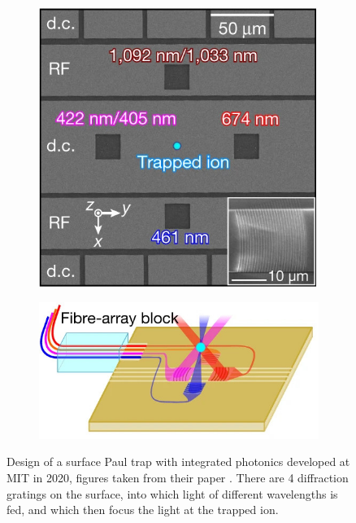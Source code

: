 \begin{figure}[H]
    \centering
    \begin{subfigure}[b]{0.3\textwidth}
        \centering
        \includegraphics[width=\textwidth]{images/TIQC_MIT_1.jpg}
    \end{subfigure}
    \hspace{3em}
    \begin{subfigure}[b]{0.45\textwidth}
        \centering
        \includegraphics[width=\textwidth]{images/TIQC_MIT_2.jpg}
    \end{subfigure}
    \caption{Design of a surface Paul trap with integrated photonics developed at MIT in 2020, figures taken from their paper \cite{niffeneggerIntegratedMultiwavelengthControl2020}.
    There are 4 diffraction gratings on the surface, into which light of different wavelengths is fed, and which then focus the light at the trapped ion.}\label{fig:TIQC_MIT}
\end{figure}

